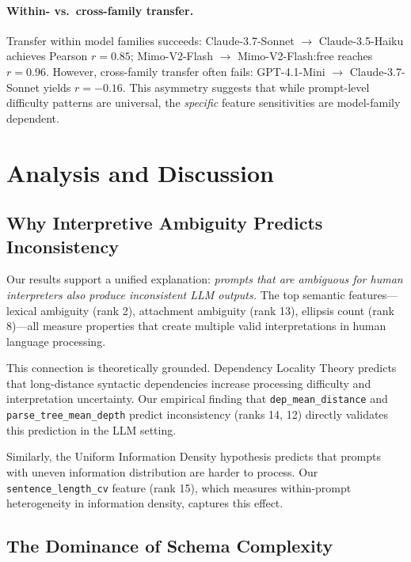\documentclass{article}
\begin{document}
\paragraph{Within- vs.\ cross-family transfer.}
Transfer within model families succeeds: Claude-3.7-Sonnet $\to$ Claude-3.5-Haiku achieves Pearson $r = 0.85$; Mimo-V2-Flash $\to$ Mimo-V2-Flash:free reaches $r = 0.96$. However, cross-family transfer often fails: GPT-4.1-Mini $\to$ Claude-3.7-Sonnet yields $r = -0.16$. This asymmetry suggests that while prompt-level difficulty patterns are universal, the \emph{specific} feature sensitivities are model-family dependent.


\section{Analysis and Discussion}
\label{sec:discussion}

\subsection{Why Interpretive Ambiguity Predicts Inconsistency}

Our results support a unified explanation: \emph{prompts that are ambiguous for human interpreters also produce inconsistent LLM outputs.} The top semantic features---lexical ambiguity (rank 2), attachment ambiguity (rank 13), ellipsis count (rank 8)---all measure properties that create multiple valid interpretations in human language processing.

This connection is theoretically grounded. Dependency Locality Theory \citep{gibson2000dependency} predicts that long-distance syntactic dependencies increase processing difficulty and interpretation uncertainty. Our empirical finding that \texttt{dep\_mean\_distance} and \texttt{parse\_tree\_mean\_depth} predict inconsistency (ranks 14, 12) directly validates this prediction in the LLM setting.

Similarly, the Uniform Information Density hypothesis \citep{jaeger2010redundancy} predicts that prompts with uneven information distribution are harder to process. Our \texttt{sentence\_length\_cv} feature (rank 15), which measures within-prompt heterogeneity in information density, captures this effect.

\subsection{The Dominance of Schema Complexity}
\end{document}
